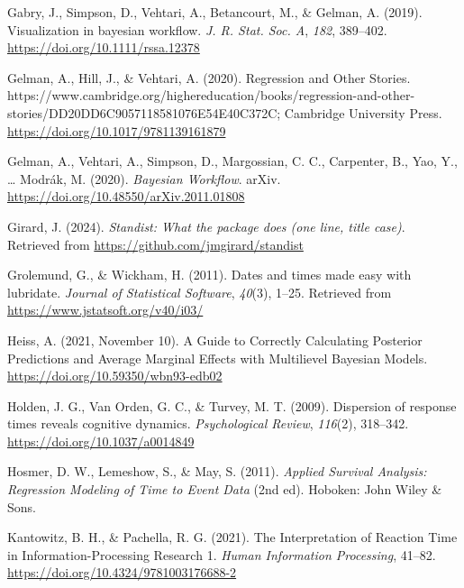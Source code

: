 \documentclass[
  man, donotrepeattitle,floatsintext]{apa6}
\newlength{\cslhangindent}
\newenvironment{CSLReferences}[2] %
 {\begin{list}{}{%
  \setlength{\itemindent}{0pt}
  \setlength{\leftmargin}{0pt}
  \setlength{\parsep}{0pt}
  \ifodd #1
   \setlength{\leftmargin}{\cslhangindent}
   \setlength{\itemindent}{-1\cslhangindent}
  \fi
  \setlength{\itemsep}{#2\baselineskip}}}
 {\end{list}}
\begin{document}
\begin{CSLReferences}{1}{0}
Gabry, J., Simpson, D., Vehtari, A., Betancourt, M., \& Gelman, A. (2019). Visualization in bayesian workflow. \emph{J. R. Stat. Soc. A}, \emph{182}, 389--402. \url{https://doi.org/10.1111/rssa.12378}

Gelman, A., Hill, J., \& Vehtari, A. (2020). Regression and {Other Stories}. https://www.cambridge.org/highereducation/books/regression-and-other-stories/DD20DD6C9057118581076E54E40C372C; Cambridge University Press. \url{https://doi.org/10.1017/9781139161879}

Gelman, A., Vehtari, A., Simpson, D., Margossian, C. C., Carpenter, B., Yao, Y., \ldots{} Modrák, M. (2020). \emph{Bayesian {Workflow}}. arXiv. \url{https://doi.org/10.48550/arXiv.2011.01808}

Girard, J. (2024). \emph{Standist: What the package does (one line, title case)}. Retrieved from \url{https://github.com/jmgirard/standist}

Grolemund, G., \& Wickham, H. (2011). Dates and times made easy with {lubridate}. \emph{Journal of Statistical Software}, \emph{40}(3), 1--25. Retrieved from \url{https://www.jstatsoft.org/v40/i03/}

Heiss, A. (2021, November 10). A Guide to Correctly Calculating Posterior Predictions and Average Marginal Effects with Multilievel {Bayesian} Models. \url{https://doi.org/10.59350/wbn93-edb02}

Holden, J. G., Van Orden, G. C., \& Turvey, M. T. (2009). Dispersion of response times reveals cognitive dynamics. \emph{Psychological Review}, \emph{116}(2), 318--342. \url{https://doi.org/10.1037/a0014849}

Hosmer, D. W., Lemeshow, S., \& May, S. (2011). \emph{Applied {Survival Analysis}: {Regression Modeling} of {Time} to {Event Data}} (2nd ed). Hoboken: John Wiley \& Sons.

Kantowitz, B. H., \& Pachella, R. G. (2021). The {Interpretation} of {Reaction Time} in {Information-Processing Research} 1. \emph{Human Information Processing}, 41--82. \url{https://doi.org/10.4324/9781003176688-2}


\end{CSLReferences}
\end{document}
